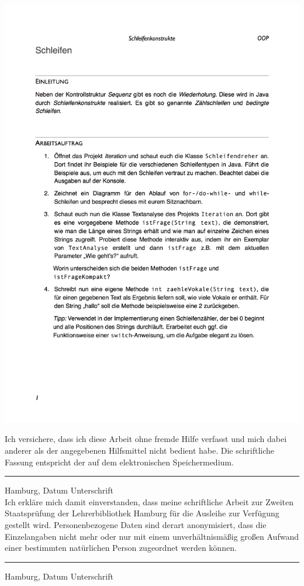 \documentclass[paper=a4, DIV=13, BCOR=8mm, oneside=on, onecolumn=on, open = any, titlepage =on, parskip =half-, headsepline = on, footsepline = off, chapterprefix = on, sectionprefix = on, appendixprefix = off, fontsize = 12pt, numbers = noenddot, abstract = off]{scrreprt}
\begin{document}
\includegraphics[height=\textheight]{images/AB_Schleifenkonstrukte.png}

\cleardoublepage
\newpage
\thispagestyle{empty}
Ich versichere, dass ich diese Arbeit ohne fremde Hilfe verfasst und mich dabei anderer als der angegebenen Hilfsmittel nicht bedient habe. Die schriftliche Fassung entspricht der auf dem elektronischen Speichermedium.

\vspace*{3cm}

\rule{\textwidth}{0.4mm} 
Hamburg, Datum \hspace*{\fill} Unterschrift \hspace*{2cm}\\

\vspace*{3cm}
Ich erkläre mich damit einverstanden, dass meine schriftliche Arbeit zur Zweiten Staatsprüfung der Lehrerbibliothek Hamburg für die Ausleihe zur Verfügung gestellt wird. Personenbezogene Daten sind derart anonymisiert, dass die Einzelangaben nicht mehr oder nur mit einem unverhältnismäßig großen Aufwand einer bestimmten natürlichen Person zugeordnet werden können.
 
\vspace*{3cm}

\rule{\textwidth}{0.4mm} 
Hamburg, Datum \hspace*{\fill} Unterschrift \hspace*{2cm}\\

\end{document}
